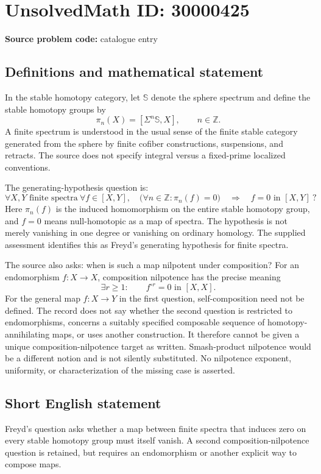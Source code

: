 \documentclass[11pt]{article}
\newcommand{\Z}{\mathbb{Z}}
\begin{document}
\section*{UnsolvedMath ID: 30000425}
\textbf{Source problem code:} catalogue entry
\subsection{Definitions and mathematical statement}
In the stable homotopy category, let $\mathbb S$ denote the sphere spectrum and define the stable homotopy groups by
\[
 \pi_n(X)=[\Sigma^n\mathbb S,X],\qquad n\in\Z.
\]
A finite spectrum is understood in the usual sense of the finite stable category generated from the sphere by finite cofiber constructions, suspensions, and retracts. The source does not specify integral versus a fixed-prime localized conventions.

The generating-hypothesis question is:
\[
 \forall X,Y\text{ finite spectra}\ \forall f\in[X,Y],
 \quad\bigl(\forall n\in\Z:\pi_n(f)=0\bigr)
       \quad\Longrightarrow\quad f=0\text{ in }[X,Y]\ ?
\]
Here $\pi_n(f)$ is the induced homomorphism on the entire stable homotopy group, and $f=0$ means null-homotopic as a map of spectra. The hypothesis is not merely vanishing in one degree or vanishing on ordinary homology. The supplied assessment identifies this as Freyd's generating hypothesis for finite spectra.

The source also asks: when is such a map nilpotent under composition? For an endomorphism $f:X\to X$, composition nilpotence has the precise meaning
\[
 \exists r\ge1:\qquad f^{\circ r}=0\text{ in }[X,X].
\]
For the general map $f:X\to Y$ in the first question, self-composition need not be defined. The record does not say whether the second question is restricted to endomorphisms, concerns a suitably specified composable sequence of homotopy-annihilating maps, or uses another construction. It therefore cannot be given a unique composition-nilpotence target as written. Smash-product nilpotence would be a different notion and is not silently substituted. No nilpotence exponent, uniformity, or characterization of the missing case is asserted.
\subsection{Short English statement}
Freyd's question asks whether a map between finite spectra that induces zero on every stable homotopy group must itself vanish. A second composition-nilpotence question is retained, but requires an endomorphism or another explicit way to compose maps.
\end{document}

